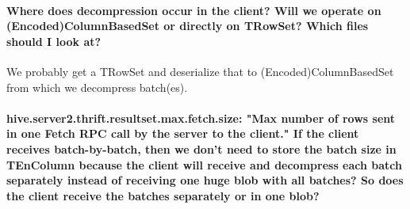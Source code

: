 \documentclass[11pt,a4paper]{article}
\begin{document}
	\paragraph{Where does decompression occur in the client? Will we operate on (Encoded)ColumnBasedSet or directly on TRowSet? Which files should I look at?}
	We probably get a TRowSet and deserialize that to (Encoded)ColumnBasedSet from which we decompress batch(es).
	
	\paragraph{hive.server2.thrift.resultset.max.fetch.size: "Max number of rows sent in one Fetch RPC call by the server to the client." If the client receives batch-by-batch, then we don't need to store the batch size in TEnColumn because the client will receive and decompress each batch separately instead of receiving one huge blob with all batches? So does the client receive the batches separately or in one blob?}
\end{document}
